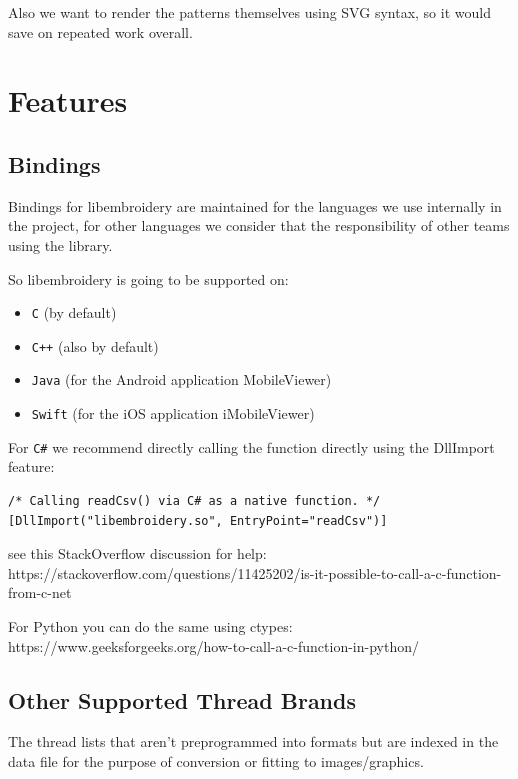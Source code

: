 \documentclass[a4paper]{report}
\begin{document}
Also we want to render the patterns themselves using SVG syntax, so it would
save on repeated work overall.

\section{Features}

\subsection{Bindings}

Bindings for libembroidery are maintained for the languages we use internally
in the project, for other languages we consider that the responsibility of
other teams using the library.

So libembroidery is going to be supported on:

\begin{itemize}
\item \texttt{C} (by default)
\item \texttt{C++} (also by default)
\item \texttt{Java} (for the Android application MobileViewer)
\item \texttt{Swift} (for the iOS application iMobileViewer)
\end{itemize}

For \texttt{C\#} we recommend directly calling the function directly
using the DllImport feature:

\begin{lstlisting}
/* Calling readCsv() via C# as a native function. */
[DllImport("libembroidery.so", EntryPoint="readCsv")]
\end{lstlisting}

see this StackOverflow discussion for help:
https://stackoverflow.com/questions/11425202/is-it-possible-to-call-a-c-function-from-c-net

For Python you can do the same using ctypes:
https://www.geeksforgeeks.org/how-to-call-a-c-function-in-python/

\subsection{Other Supported Thread Brands}

The thread lists that aren't preprogrammed into formats but are indexed in
the data file for the purpose of conversion or fitting to images/graphics.
\end{document}
